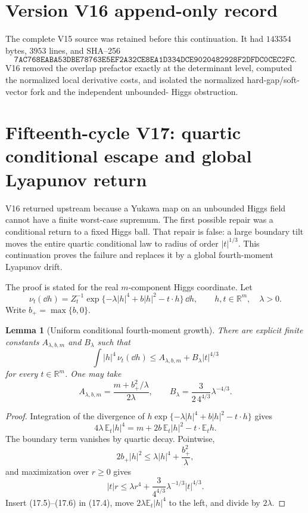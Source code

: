 \documentclass[11pt]{article}
\newtheorem{lemma}[theorem]{Lemma}
\theoremstyle{remark}
\begin{document}
\section*{Version V16 append-only record}
The complete V15 source was retained before this continuation.  It
had \(143354\) bytes, \(3953\) lines, and SHA--256
\[
 \texttt{7AC768EABA53DBE78763E5EF2A32CE8EA1D334DCE9020482928F2DFDC0CEC2FC}.
\]
V16 removed the overlap prefactor exactly at the determinant level,
computed the normalized local derivative costs, and isolated the
normalized hard-gap/soft-vector fork and the independent unbounded-
Higgs obstruction.
\section{Fifteenth-cycle V17: quartic conditional escape and global Lyapunov return}
\label{sec:v15v17}

V16 returned upstream because a Yukawa map on an unbounded Higgs
field cannot have a finite worst-case supremum.  The first possible
repair was a conditional return to a fixed Higgs ball.  That repair
is false: a large boundary tilt moves the entire quartic conditional
law to radius of order \(|t|^{1/3}\).  This continuation proves the
failure and replaces it by a global fourth-moment Lyapunov drift.

The proof is stated for the real \(m\)-component Higgs coordinate.
Let
\[
 \nu_t(\dd h)
 =
 Z_t^{-1}
 \exp\{-\lambda|h|^4+b|h|^2-t\mathbin{\cdot}h\}\,\dd h,
 \qquad h,t\in\mathbb R^m,\quad\lambda>0.                   \tag{17.1}
\]
Write \(b_+=\max\{b,0\}\).

\begin{lemma}[Uniform conditional fourth-moment growth]
\label{lem:v15v17-moment}
There are explicit finite constants \(A_{\lambda,b,m}\) and
\(B_\lambda\) such that
\[
 \boxed{
 \int|h|^4\,\nu_t(\dd h)
 \le A_{\lambda,b,m}
     +B_\lambda |t|^{4/3}}                                 \tag{17.2}
\]
for every \(t\in\mathbb R^m\).  One may take
\[
 A_{\lambda,b,m}
 =\frac{m+b_+^2/\lambda}{2\lambda},
 \qquad
 B_\lambda
 =\frac{3}{2\,4^{4/3}}\lambda^{-4/3}.                       \tag{17.3}
\]
\end{lemma}

\begin{proof}
Integration of the divergence of
\(h\exp\{-\lambda|h|^4+b|h|^2-t\cdot h\}\) gives
\[
 4\lambda\,\mathbb E_t|h|^4
 =
 m+2b\,\mathbb E_t|h|^2-t\cdot\mathbb E_t h.                \tag{17.4}
\]
The boundary term vanishes by quartic decay.  Pointwise,
\[
 2b_+|h|^2
 \le\lambda|h|^4+\frac{b_+^2}{\lambda},                     \tag{17.5}
\]
and maximization over \(r\ge0\) gives
\[
 |t|r
 \le\lambda r^4+
 \frac{3}{4^{4/3}}\lambda^{-1/3}|t|^{4/3}.                  \tag{17.6}
\]
Insert (17.5)--(17.6) in (17.4), move
\(2\lambda\mathbb E_t|h|^4\) to the left, and divide by
\(2\lambda\).
\end{proof}
\end{document}
